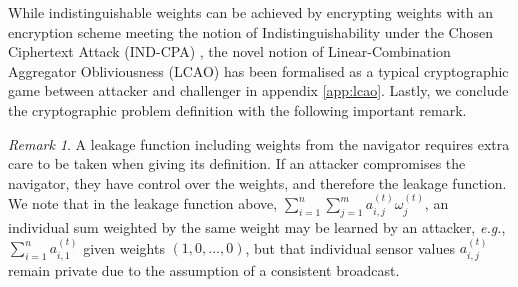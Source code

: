 \documentclass[10pt,letterpaper,oneside,twocolumn,journal]{IEEEtran}
\theoremstyle{definition}
\theoremstyle{definition}
\theoremstyle{remark}
\newtheorem*{remark}{Remark}
\begin{document}
While indistinguishable weights can be achieved by encrypting weights with an encryption scheme meeting the notion of Indistinguishability under the Chosen Ciphertext Attack (IND-CPA) \cite{katzIntroductionModernCryptography2008}, the novel notion of Linear-Combination Aggregator Obliviousness (LCAO) has been formalised as a typical cryptographic game between attacker and challenger in appendix \ref{app:lcao}. Lastly, we conclude the cryptographic problem definition with the following important remark.
\begin{remark}
    A leakage function including weights from the navigator requires extra care to be taken when giving its definition. If an attacker compromises the navigator, they have control over the weights, and therefore the leakage function. We note that in the leakage function above, $\sum^n_{i=1}\sum^m_{j=1}a^{(t)}_{i,j}\omega^{(t)}_j$, an individual sum weighted by the same weight may be learned by an attacker, \textit{e.g.}, $\sum^n_{i=1}a^{(t)}_{i,1}$ given weights $(1,0,\dots,0)$, but that individual sensor values $a^{(t)}_{i,j}$ remain private due to the assumption of a consistent broadcast.
\end{remark}

% 
% 
\end{document}
